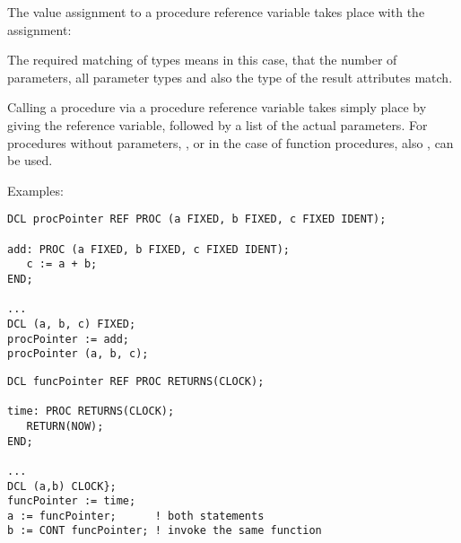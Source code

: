 The value assignment to a procedure reference variable takes place with
the assignment:

\begin{grammarframe}
\end{grammarframe}


The required matching of types means in this case, that the number of
parameters, all parameter types and also the type of the result
attributes match.

Calling a procedure via a procedure reference variable takes simply
place by giving the reference variable, followed by a list of the actual
parameters. For procedures without parameters, , or in the case of
function procedures, also , can be used.

Examples:
\begin{lstlisting}
DCL procPointer REF PROC (a FIXED, b FIXED, c FIXED IDENT);

add: PROC (a FIXED, b FIXED, c FIXED IDENT);
   c := a + b;
END;

...
DCL (a, b, c) FIXED;
procPointer := add;
procPointer (a, b, c);
\end{lstlisting}

\begin{lstlisting}
DCL funcPointer REF PROC RETURNS(CLOCK);

time: PROC RETURNS(CLOCK);
   RETURN(NOW);
END;

...
DCL (a,b) CLOCK};
funcPointer := time;
a := funcPointer;      ! both statements
b := CONT funcPointer; ! invoke the same function
\end{lstlisting}

